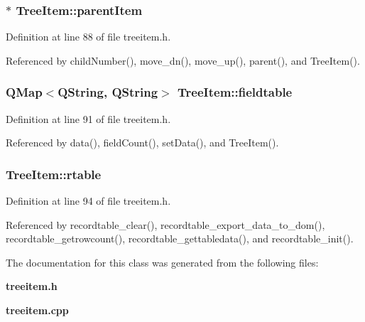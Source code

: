 \subsubsection{$\ast$ {\bf Tree\-Item::parent\-Item}\hspace{0.3cm}{\tt  [private]}}\label{classTreeItem_24d1acb93b04dbf0f67036263d87b8af}




Definition at line 88 of file treeitem.h.

Referenced by child\-Number(), move\_\-dn(), move\_\-up(), parent(), and Tree\-Item().
\subsubsection{\setlength{\rightskip}{0pt plus 5cm}QMap$<$QString, QString$>$ {\bf Tree\-Item::fieldtable}\hspace{0.3cm}{\tt  [private]}}\label{classTreeItem_373cdc232a457da1761e4e7136d1586a}




Definition at line 91 of file treeitem.h.

Referenced by data(), field\-Count(), set\-Data(), and Tree\-Item().
\subsubsection{ {\bf Tree\-Item::rtable}\hspace{0.3cm}{\tt  [private]}}\label{classTreeItem_cf2a253a2d4fc5f803b21d7bce0582ee}




Definition at line 94 of file treeitem.h.

Referenced by recordtable\_\-clear(), recordtable\_\-export\_\-data\_\-to\_\-dom(), recordtable\_\-getrowcount(), recordtable\_\-gettabledata(), and recordtable\_\-init().

The documentation for this class was generated from the following files:\begin{CompactItemize}
\item 
{\bf treeitem.h}\item 
{\bf treeitem.cpp}\end{CompactItemize}

